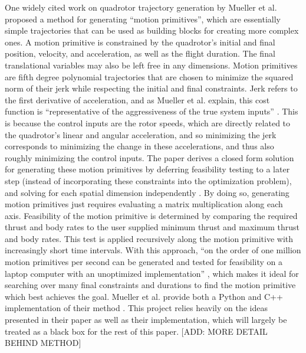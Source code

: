 \documentclass[pageno]{jpaper}
\newcommand{\quotes}[1]{``#1''}
\begin{document}
One widely cited work on quadrotor trajectory generation by Mueller et al. \cite{mueller} proposed a method for generating \quotes{motion primitives}, which are essentially simple trajectories that can be used as building blocks for creating more complex ones. A motion primitive is constrained by the quadrotor's initial and final position, velocity, and acceleration, as well as the flight duration. The final translational variables may also be left free in any dimensions. Motion primitives are fifth degree polynomial trajectories that are chosen to minimize the squared norm of their jerk while respecting the initial and final constraints. Jerk refers to the first derivative of acceleration, and as Mueller et al. explain, this cost function is \quotes{representative of the aggressiveness of the true system inputs} \cite{mueller}. This is because the control inputs are the rotor speeds, which are directly related to the quadrotor's linear and angular acceleration, and so minimizing the jerk corresponds to minimizing the change in these accelerations, and thus also roughly minimizing the control inputs. The paper derives a closed form solution for generating these motion primitives by deferring feasibility testing to a later step (instead of incorporating these constraints into the optimization problem), and solving for each spatial dimension independently \cite{mueller}. By doing so, generating motion primitives just requires evaluating a matrix multiplication along each axis. Feasibility of the motion primitive is determined by comparing the required thrust and body rates to the user supplied minimum thrust and maximum thrust and body rates. This test is applied recursively along the motion primitive with increasingly short time intervals. With this approach, \quotes{on the order of one million motion primitives per second can be generated and tested for feasibility on a laptop computer with an unoptimized implementation} \cite{mueller}, which makes it ideal for searching over many final constraints and durations to find the motion primitive which best achieves the goal. Mueller et al. provide both a Python and C++ implementation of their method \cite{generator}. This project relies heavily on the ideas presented in their paper as well as their implementation, which will largely be treated as a black box for the rest of this paper. [ADD: MORE DETAIL BEHIND METHOD]
\end{document}
